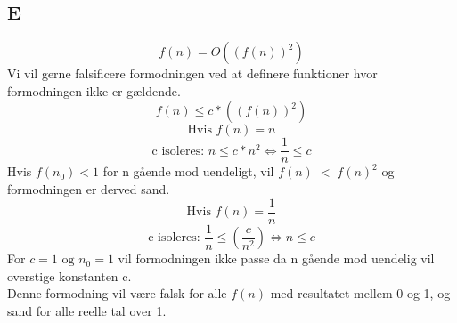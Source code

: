\documentclass{article}
\begin{document}
	\subsection{E}
		\[ f(n)=O((f(n))^2) \]
		Vi vil gerne falsificere formodningen ved at definere funktioner hvor formodningen ikke er gældende.\\
            \[ f(n) \leq c*((f(n))^2) \]
            \[ \text{Hvis  } f(n) = n \]
            \[ \text{c isoleres: } n \leq c*n^2 \Leftrightarrow \frac{1}{n} \leq c\]
                Hvis $ f(n_0) < 1 $ for n gående mod uendeligt, vil $ f(n) \; < \; f(n)^2 $ og formodningen er derved sand.\\
            \[ \text{Hvis  } f(n) = \frac{1}{n} \]  
            \[ \text{c isoleres: } \frac{1}{n} \leq \left( \frac{c}{n^2} \right) \Leftrightarrow n \leq c \]
        For $ c=1 \text{ og } n_0 = 1  $ vil formodningen ikke passe da n gående mod uendelig vil overstige konstanten c.\\
        Denne formodning vil være falsk for alle $ f(n) $ med resultatet mellem 0 og 1, og sand for alle reelle tal over 1.
\end{document}
